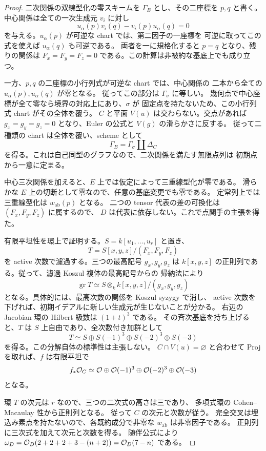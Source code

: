 \begin{proof}
二次関係の双線型化の零スキームを $\Gamma_B$ とし、その二座標を $p,q$ と書く。
中心関係は全ての一次生成元 $v_i$ に対し
\[
 u_\alpha(p)v_i(q)-v_i(p)u_\alpha(q)=0
\]
を与える。$u_\alpha(p)$ が可逆な chart では、第二因子の一座標を
可逆に取ってこの式を使えば $u_\alpha(q)$ も可逆である。
両者を一に規格化すると $p=q$ となり、残りの関係は
$F_x=F_y=F_z=0$ である。この計算は非被約な基底上でも成り立つ。

一方、$p,q$ の二座標の小行列式が可逆な chart では、中心関係の
二本から全ての $u_\alpha(p),u_\alpha(q)$ が零となる。
従ってこの部分は $\Gamma_\sigma$ に等しい。
幾何点で中心座標が全て零なら境界の対応上にあり、$\sigma$ が
固定点を持たないため、この小行列式 chart がその全体を覆う。
$C$ と平面 $V(u)$ は交わらない。交点があれば
$g_x=g_y=g_z=0$ となり、Euler の公式と $V(g)$ の滑らかさに反する。
従って二種類の chart は全体を覆い、scheme として
\[
 \Gamma_B=\Gamma_\sigma\amalg\Delta_C
\]
を得る。これは自己同型のグラフなので、二次関係を満たす無限点列は
初期点から一意に定まる。

中心三次関係を加えると、$E$ 上では仮定によって三重線型化が零である。
滑らかな $E$ 上の切断として零なので、任意の基底変更でも零である。
定常列上では三重線型化は $w_{\mathrm{ab}}(p)$ となる。
二つの tensor 代表の差の可換化は $(F_x,F_y,F_z)$ に属するので、
$D$ は代表に依存しない。これで点関手の主張を得た。

有限平坦性を環上で証明する。$S=k[u_1,\ldots,u_r]$ と置き、
\[
 T=S[x,y,z]/(F_x,F_y,F_z)
\]
を active 次数で濾過する。三つの最高記号 $g_x,g_y,g_z$ は
$k[x,y,z]$ の正則列である。従って、濾過 Koszul 複体の最高記号からの
帰納法により
\[
 \operatorname{gr}T\simeq
 S\otimes_k k[x,y,z]/(g_x,g_y,g_z)
\]
となる。具体的には、最高次数の関係を Koszul syzygy で消し、
active 次数を下げれば、初期イデアルに新しい生成元が生じないことが分かる。
右辺の Jacobian 環の Hilbert 級数は $(1+t)^3$ である。
その斉次基底を持ち上げると、$T$ は $S$ 上自由であり、全次数付き加群として
\begin{equation}\label{eq:critical-free-module}
 T\simeq S\oplus S(-1)^3\oplus S(-2)^3\oplus S(-3)
\end{equation}
を得る。この分解自体の標準性は主張しない。
$C\cap V(u)=\varnothing$ と合わせて Proj を取れば、$f$ は有限平坦で
\begin{equation}\label{eq:critical-pushforward}
 f_*\mathcal O_C\simeq\mathcal O\oplus\mathcal O(-1)^3\oplus\mathcal O(-2)^3\oplus\mathcal O(-3)
\end{equation}
となる。

環 $T$ の次元は $r$ なので、三つの二次式の高さは三であり、
多項式環の Cohen--Macaulay 性から正則列となる。
従って $C$ の次元と次数が従う。
完全交叉は埋込み素点を持たないので、各既約成分で非零な
$w_{\mathrm{ab}}$ は非零因子である。
正則列に三次式を加えて次元と次数を得る。
随伴公式により
$\omega_D=\mathcal O_D(2+2+2+3-(n+2))=\mathcal O_D(7-n)$ である。
\end{proof}

